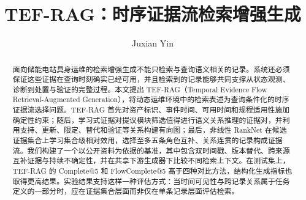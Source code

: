 \documentclass[letterpaper,10pt,conference]{IEEEtran}
\title{TEF-RAG：时序证据流检索增强生成}
\author{Juxian Yin}
\begin{document}
\maketitle

\begin{abstract}
面向储能电站具身运维的检索增强生成不能只检索与查询语义相关的记录。系统还必须保证这些证据在查询时刻确实已经可用，并且检索到的记录能够共同支撑从状态观测、诊断到处置与验证的完整过程。本文提出 TEF-RAG（Temporal Evidence Flow Retrieval-Augmented Generation），将动态运维环境中的检索表述为查询条件化的时序证据流选择问题。TEF-RAG 首先对资产标识、事件时间、可用时间和规程适用性施加确定性约束；随后，学习式证据对提议模块筛选值得进行语义关系推理的证据对，并利用支持、更新、限定、替代和验证等关系构建有向图；最后，非线性 RankNet 在候选证据集合上学习集合级相对效用，选择至多五条角色互补、关系连贯的记录构成证据流。我们构建了一个以公开资料为依据的基准，其中包含双时间戳、版本替代、跨来源互补证据与持续不确定性，并在共享下游生成器下比较不同检索上下文。在测试集上，TEF-RAG 的 Complete@5 和 FlowComplete@5 高于四种对比方法，结构化生成指标也取得更高结果。实验结果支持这样一种评估方式：当时间可见性与跨记录关系属于任务定义的一部分时，应在证据集合层面而非仅在单条记录层面评估检索。
\end{abstract}







\newpage
\appendices

\end{document}
